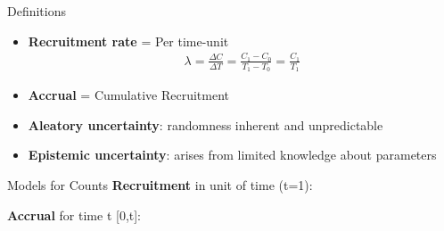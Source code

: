 \documentclass[english]{beamer}\usepackage[]{graphicx}\usepackage[]{xcolor}
\begin{document}
\begin{frame}{Definitions}

\begin{itemize}
\item \textbf{Recruitment rate} = Per time-unit \citep{piantadosi2024clinical}
\begin{align*}
\lambda = \frac{\Delta C}{\Delta T} = \frac{C_1 - C_0}{T_1 - T_0} = \frac{C_1}{T_1}
\end{align*}

\item \textbf{Accrual} = Cumulative Recruitment
\item \textbf{Aleatory uncertainty}: randomness inherent and unpredictable
\item \textbf{Epistemic uncertainty}: arises from limited knowledge about parameters



\end{itemize}


\end{frame}

\begin{frame}[shrink = 5]{Models for Counts}
\textbf{Recruitment} in unit of time (t=1):
\begin{table}[h!]
\centering
{}
\end{table}

\textbf{Accrual} for time t [0,t]:
\begin{table}[h!]
\centering
{}
\end{table}

\end{frame}
\end{document}
